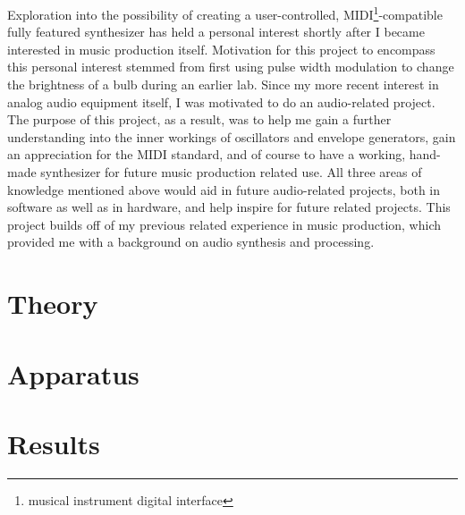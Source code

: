 \documentclass[12pt]{article}
\begin{document}
Exploration into the possibility of creating a user-controlled, MIDI\footnote{musical instrument digital interface}-compatible fully featured synthesizer has held a personal interest shortly after I became interested in music production itself.
Motivation for this project to encompass this personal interest stemmed from first using pulse width modulation to change the brightness of a bulb during an earlier lab.
Since my more recent interest in analog audio equipment itself, I was motivated to do an audio-related project.
The purpose of this project, as a result, was to help me gain a further understanding into the inner workings of oscillators and envelope generators, gain an appreciation for the MIDI standard, and of course to have a working, hand-made synthesizer for future music production related use.
All three areas of knowledge mentioned above would aid in future audio-related projects, both in software as well as in hardware, and help inspire for future related projects.
This project builds off of my previous related experience in music production, which provided me with a background on audio synthesis and processing.

\section{Theory}\label{sec:theory}


\section{Apparatus}\label{sec:apparatus}


\section{Results}\label{sec:results}
\end{document}
